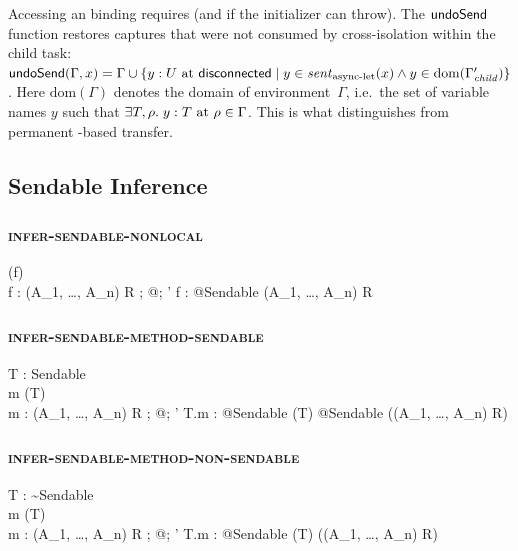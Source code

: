 Accessing an  binding requires  (and  if the initializer can throw). The $\textsf{undoSend}$ function restores captures that were not consumed by cross-isolation within the child task: $\textsf{undoSend}(\Gamma, x) = \Gamma \cup \{y : U \text{ at } \textsf{disconnected} \mid y \in \mathit{sent}_{\text{async-let}}(x) \land y \in \mathrm{dom}(\Gamma'_{\mathit{child}})\}$. Here $\mathrm{dom}(\Gamma)$ denotes the domain of environment~$\Gamma$, i.e.\ the set of variable names $y$ such that $\exists T, \rho.\; y : T \text{ at } \rho \in \Gamma$. This is what distinguishes  from permanent -based transfer.

\subsection{Sendable Inference}

\subsubsection{\textsc{infer-sendable-nonlocal}}

  {\isNonLocal(f) \\ f : (A_1, \ldots, A_n)\; \alpha \to R}
  {\Gamma;\; @\kappa;\; \alpha' \vdash f : @\textsf{Sendable}\; (A_1, \ldots, A_n)\; \alpha \to R \at \mathunderscore \dashv \Gamma}

\subsubsection{\textsc{infer-sendable-method-sendable}}

  {T : \textsf{Sendable} \\ m \in \instanceMethods(T) \\ m : (A_1, \ldots, A_n)\; \alpha \to R}
  {\Gamma;\; @\kappa;\; \alpha' \vdash T.m : @\textsf{Sendable}\; (T) \to @\textsf{Sendable}\; ((A_1, \ldots, A_n)\; \alpha \to R) \at \mathunderscore \dashv \Gamma}

\subsubsection{\textsc{infer-sendable-method-non-sendable}}

  {T : {\sim}\textsf{Sendable} \\ m \in \instanceMethods(T) \\ m : (A_1, \ldots, A_n)\; \alpha \to R}
  {\Gamma;\; @\kappa;\; \alpha' \vdash T.m : @\textsf{Sendable}\; (T) \to ((A_1, \ldots, A_n)\; \alpha \to R) \at \mathunderscore \dashv \Gamma}

